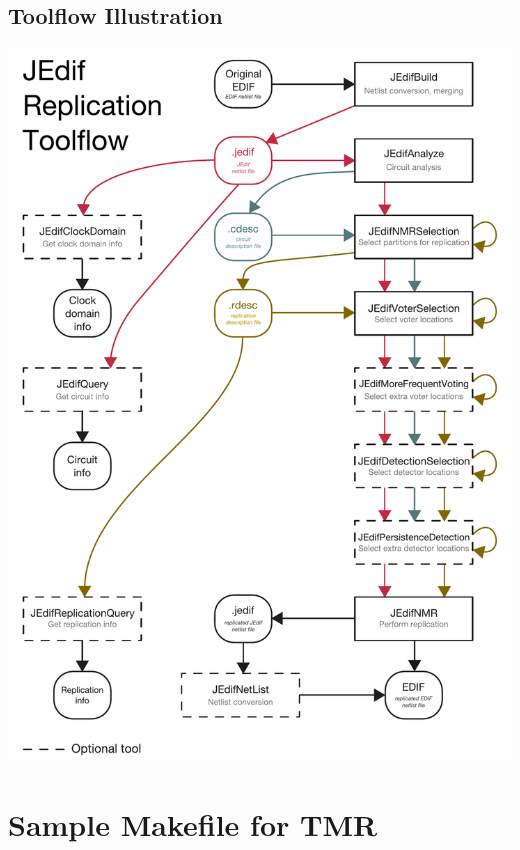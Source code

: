 \documentclass[english]{article}
\numberwithin{figure}{section}
\begin{document}
\subsection{Toolflow Illustration}
\includegraphics[scale=0.7]{tool_flow.pdf}
\newpage

\newpage

\newpage

\newpage

\newpage

\newpage

\newpage

\newpage

\newpage

\newpage

\newpage

\newpage

\newpage




\newpage
\section{Sample Makefile for TMR}
\newpage
\end{document}
